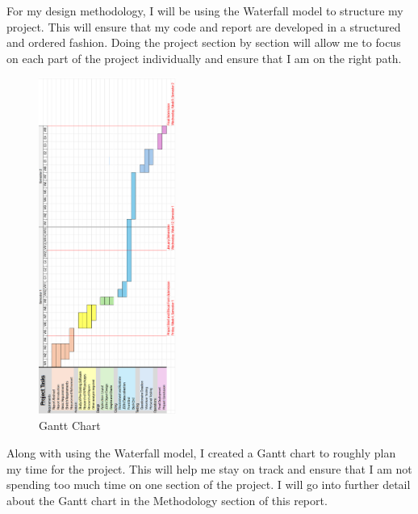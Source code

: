 \documentclass{report}
\begin{document}
For my design methodology, I will be using the Waterfall model to structure my project. This will ensure that my code and report are developed in a structured and ordered fashion. Doing the project section by section will allow me to focus on each part of the project individually and ensure that I am on the right path.
\newpage
\begin{center}
    \begin{figure}[h]
        \centering
        \includegraphics[width=0.4\textwidth, angle=270]{gantt_chart}
        \caption{Gantt Chart}
        \label{fig:gantt_chart}
    \end{figure}
\end{center}
Along with using the Waterfall model, I created a Gantt chart to roughly plan my time for the project. This will help me stay on track and ensure that I am not spending too much time on one section of the project. I will go into further detail about the Gantt chart in the Methodology section of this report.



\newpage
\end{document}
